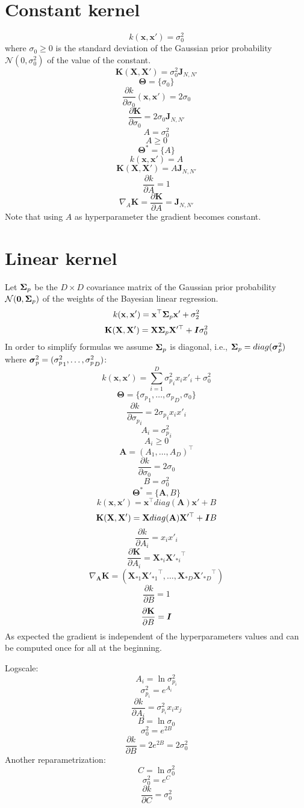 \documentclass[a4paper,11pt]{article}
\newcommand\x{{\mathbf x}}
\newcommand\X{{\mathbf X}}
\newcommand\K{{\mathbf K}}
\newcommand\J{{\mathbf J}}
\newcommand{\Ivec}[1]{\mbox{\boldmath $#1$}}
\begin{document}
\section{Constant kernel}
$$k(\x,\x') = \sigma_0^2$$
where $\sigma_0 \ge 0$ is the standard deviation of the Gaussian prior
probability $\mathcal{N}(0,\sigma_0^2)$ of the value of the constant.
$$\K(\X,\X') = \sigma_0^2 \J_{N,N'}$$
$$\mathbf{\Theta} = \{\sigma_0\}$$
$$\frac{\partial k}{\partial \sigma_0}(\x,\x') = 2\sigma_0$$
$$\frac{\partial \K}{\partial \sigma_0} = 2\sigma_0 \J_{N,N'}$$
$$A = \sigma_0^2$$
$$A \ge 0$$
$$\mathbf{\Theta}^* = \{A\}$$
$$k(\x,\x') = A$$
$$\K(\X,\X') = A \J_{N,N'}$$
$$\frac{\partial k}{\partial A} = 1$$
$$\nabla_A \K = \frac{\partial \K}{\partial A} = \J_{N,N'}$$
Note that using $A$ as hyperparameter the gradient becomes constant.

\section{Linear kernel}
Let $\Ivec{\Sigma}_p$ be the $D \times D$ covariance matrix of the Gaussian
prior probability $\mathcal{N}(\Ivec{0},\Ivec{\Sigma}_p)$ of the weights of
the Bayesian linear regression.
$$k(\x,\x') = \x^{\top} \Ivec{\Sigma}_p \x' + \sigma_2^2$$
$$\K(\X,\X') = \X \Ivec{\Sigma}_p \X'^{\top} + \Ivec{I}\sigma_0^2$$
In order to simplify formulas we assume $\Ivec{\Sigma}_p$ is diagonal, i.e.,
$\Ivec{\Sigma}_p = diag(\Ivec{\sigma}^2_p)$ where $\Ivec{\sigma}^2_p =
({\sigma^2_p}_1,\ldots,{\sigma^2_p}_D)$:
$$k(\x,\x') = \sum_{i=1}^D {\sigma^2_p}_i x_i x'_i + \sigma_0^2$$
$$\mathbf{\Theta} = \{{\sigma_p}_1,\ldots,{\sigma_p}_D,\sigma_0\}$$
$$\frac{\partial k}{\partial {\sigma_p}_i} = 2 {\sigma_p}_i x_i x'_i$$
$$A_i = {\sigma_p^2}_i$$
$$A_i \ge 0$$
$$\mathbf{A} = (A_1,\ldots,A_D)^{\top}$$
$$\frac{\partial k}{\partial \sigma_0} = 2 \sigma_0$$
$$B = \sigma_0^2$$
$$\mathbf{\Theta}^* = \{ \mathbf{A} , B\}$$
$$k(\x,\x') = \x^{\top} diag(\mathbf{A}) \x' + B$$
$$\K(\X,\X') = \X diag(\mathbf{A}) \X'^{\top} + \Ivec{I}B$$
$$\frac{\partial k}{\partial A_i} = x_i x'_i$$
$$\frac{\partial \K}{\partial A_i} = \X_{* i} {\X'_{* i}}^{\top}$$
$$\nabla_{\mathbf{A}} \K = ( \X_{* 1} {\X'_{* 1}}^{\top}, \ldots,
\X_{* D} {\X'_{* D}}^{\top})$$
$$\frac{\partial k}{\partial B} = 1$$
$$\frac{\partial \K}{\partial B} = \Ivec{I}$$
As expected the gradient is independent of the hyperparameters values
and can be computed once for all at the beginning.

Logscale:
$$A_i = \ln{\sigma_{p_i}^2}$$
$$\sigma_{p_i}^2 = e^{A_i}$$
$$\frac{\partial k}{\partial A_i} = \sigma_{p_i}^2 x_i x_j$$
$$B = \ln{\sigma_0}$$
$$\sigma_0^2 = e^{2B}$$
$$\frac{\partial k}{\partial B} = 2 e^{2B} = 2 \sigma_0^2$$
Another reparametrization:
$$C = \ln{\sigma_0^2}$$
$$\sigma_0^2 = e^C$$
$$\frac{\partial k}{\partial C} = \sigma_0^2$$
\end{document}

